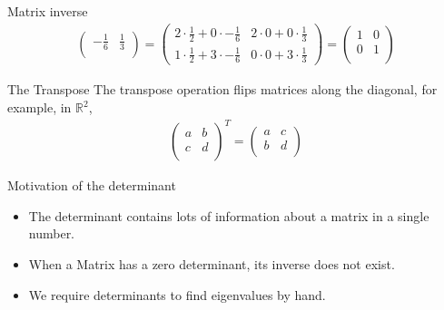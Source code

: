 \documentclass[notes]{beamer}
\begin{document}
\begin{frame}{Matrix inverse}
{\begin{align}
\begin{pmatrix}
          -\frac{1}{6} & \frac{1}{3}\\ 
        \end{pmatrix}
      = 
        \begin{pmatrix}
          2 \cdot \frac{1}{2} + 0 \cdot -\frac{1}{6} & 2 \cdot 0 + 0 \cdot \frac{1}{3}  \\
          1 \cdot \frac{1}{2} + 3 \cdot -\frac{1}{6} & 0 \cdot 0 + 3 \cdot \frac{1}{3} 
        \end{pmatrix}
      =
      \begin{pmatrix}
        1 & 0 \\
        0 & 1 \\ 
      \end{pmatrix}
      \end{align}
      }
    \end{frame}


    \begin{frame}{The Transpose}
      The transpose operation flips matrices along the diagonal, for example, in $\mathbb{R}^2$,
      \begin{align}
        \begin{pmatrix}
          a & b \\
          c & d \\
        \end{pmatrix}^T
        =
        \begin{pmatrix}
          a & c \\
          b & d \\
        \end{pmatrix}
      \end{align}
    \end{frame}

    \begin{frame}{Motivation of the determinant}
      \begin{itemize}
        \item The determinant contains lots of information about a matrix in a single number.
        \item When a Matrix has a zero determinant, its inverse does not exist.
        \item We require determinants to find eigenvalues by hand.
      \end{itemize}
    \end{frame}
\end{document}
